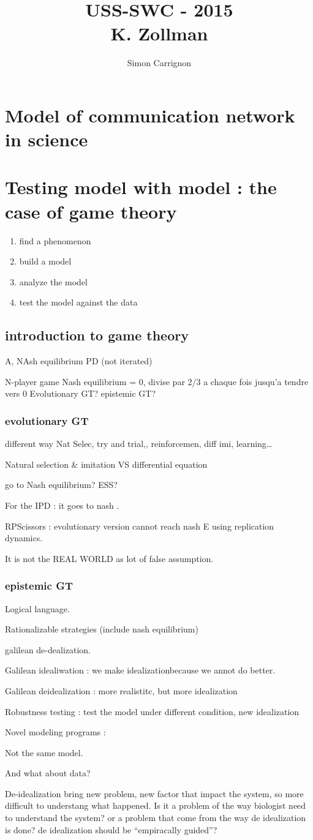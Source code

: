 \documentclass[a4paper]{article}
\title{USS-SWC - 2015\\
K. Zollman}
\author{Simon Carrignon}
\begin{document}
\section{Model of communication network in science}
\section{Testing model with model : the case of game theory}
\begin{enumerate}
	\item 	find a phenomenon 
	\item 	build a model
	\item 	analyze the model
	\item 	test the model against the data
\end{enumerate}


\subsection{introduction to game theory}
A, NAsh equilibrium PD (not iterated)

N-player game Nash equilibrium = 0, divise par 2/3 a chaque fois jusqu'a tendre vers 0
Evolutionary GT? 
epistemic GT? 
\subsubsection{evolutionary GT}

different way Nat Selec, try and trial,, reinforcemen, diff imi, learning\ldots


Natural selection \& imitation
VS differential equation

go to Nash equilibrium? ESS?

For the IPD : it goes to nash .

RPScissors : evolutionary version cannot reach nash E using replication dynamics.


It is not the REAL WORLD as lot of false assumption.
\subsubsection{epistemic GT}

Logical language.

Rationalizable strategies (include nash equilibrium)


galilean de-dealization.

Galilean idealiwation : we make idealizationbecause we annot do better.

Galilean deidealization : more realistitc, but more idealization

Robustness testing : test the model under different condition, new idealization

Novel modeling programs :

Not the same model.


And what about data?


De-idealization bring new problem, new factor that impact the system, so more difficult to understang what happened. Is it a problem of the way biologist need to understand the system? or a problem that come from the way de idealization is done? de idealization should be ``empiracally guided''?
\end{document}
